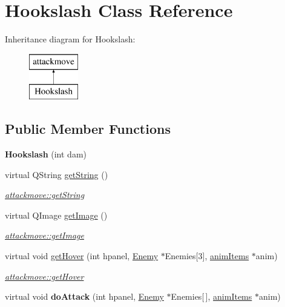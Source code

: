 \hypertarget{class_hookslash}{\section{Hookslash Class Reference}
\label{class_hookslash}
}
Inheritance diagram for Hookslash\-:\begin{figure}[H]
\begin{center}
\leavevmode
\includegraphics[height=2.000000cm]{class_hookslash}
\end{center}
\end{figure}
\subsection*{Public Member Functions}
\begin{DoxyCompactItemize}
\item 
\hypertarget{class_hookslash_a70ac467f48108a4fe26e4db666b217f8}{{\bfseries Hookslash} (int dam)}\label{class_hookslash_a70ac467f48108a4fe26e4db666b217f8}

\item 
virtual Q\-String \hyperlink{class_hookslash_aaf31aabb624b138d98f3c94fe1c37fcc}{get\-String} ()
\begin{DoxyCompactList}\small\item\em \hyperlink{classattackmove_ada49eedf4b893372c576edd48fe73161}{attackmove\-::get\-String} \end{DoxyCompactList}\item 
virtual Q\-Image \hyperlink{class_hookslash_a65c6e01ac90d1f01139dd08b93aeaa0a}{get\-Image} ()
\begin{DoxyCompactList}\small\item\em \hyperlink{classattackmove_aca59a2343b7a6c195d300dda5c8d952d}{attackmove\-::get\-Image} \end{DoxyCompactList}\item 
virtual void \hyperlink{class_hookslash_ab6a6ca9582c4d8dad26b481292bca6a0}{get\-Hover} (int hpanel, \hyperlink{class_enemy}{Enemy} $\ast$Enemies\mbox{[}3\mbox{]}, \hyperlink{classanim_items}{anim\-Items} $\ast$anim)
\begin{DoxyCompactList}\small\item\em \hyperlink{classattackmove_a0ff82349551bd72f4d57b3367bb318fa}{attackmove\-::get\-Hover} \end{DoxyCompactList}\item 
\hypertarget{class_hookslash_a704f02d57c898d1256c260218fe5c359}{virtual void {\bfseries do\-Attack} (int hpanel, \hyperlink{class_enemy}{Enemy} $\ast$Enemies\mbox{[}$\,$\mbox{]}, \hyperlink{classanim_items}{anim\-Items} $\ast$anim)}\label{class_hookslash_a704f02d57c898d1256c260218fe5c359}

\end{DoxyCompactItemize}
